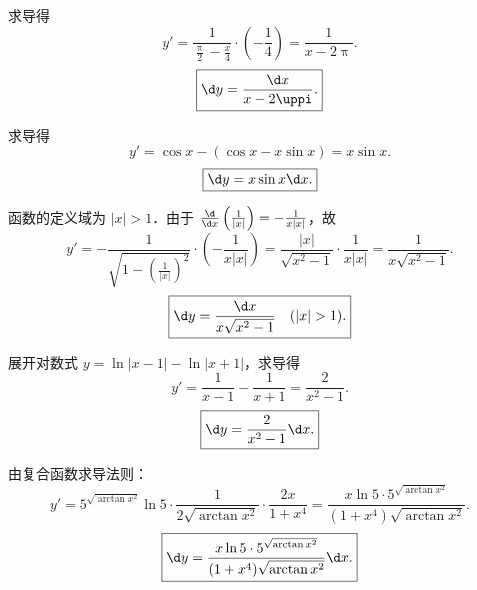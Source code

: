 \begin{solution}

    求导得
    \begin{equation}
        y' = \frac{1}{\frac{\uppi}{2} - \frac{x}{4}} \cdot \left( -\frac{1}{4} \right) = \frac{1}{x - 2\uppi}.
    \end{equation}
    \begin{equation}
        \boxed{\d y = \frac{\d x}{x - 2\uppi}.}
    \end{equation}


    求导得
    \begin{equation}
        y' = \cos x - (\cos x - x\sin x) = x\sin x.
    \end{equation}
    \begin{equation}
        \boxed{\d y = x\sin x \d x.}
    \end{equation}


    函数的定义域为 $|x| > 1$．由于 $\frac{\d}{\d x}\left( \frac{1}{|x|} \right) = -\frac{1}{x|x|}$，故
    \begin{equation}
        y' = -\frac{1}{\sqrt{1 - \left(\frac{1}{|x|}\right)^2}} \cdot \left( -\frac{1}{x|x|} \right) = \frac{|x|}{\sqrt{x^2 - 1}} \cdot \frac{1}{x|x|} = \frac{1}{x\sqrt{x^2 - 1}}.
    \end{equation}
    \begin{equation}
        \boxed{\d y = \frac{\d x}{x\sqrt{x^2 - 1}} \quad (|x| > 1).}
    \end{equation}


    展开对数式 $y = \ln|x-1| - \ln|x+1|$，求导得
    \begin{equation}
        y' = \frac{1}{x-1} - \frac{1}{x+1} = \frac{2}{x^2 - 1}.
    \end{equation}
    \begin{equation}
        \boxed{\d y = \frac{2}{x^2 - 1}\d x.}
    \end{equation}


    由复合函数求导法则：
    \begin{equation}
        y' = 5^{\sqrt{\arctan x^2}} \ln 5 \cdot \frac{1}{2\sqrt{\arctan x^2}} \cdot \frac{2x}{1 + x^4} = \frac{x \ln 5 \cdot 5^{\sqrt{\arctan x^2}}}{(1 + x^4)\sqrt{\arctan x^2}}.
    \end{equation}
    \begin{equation}
        \boxed{\d y = \frac{x \ln 5 \cdot 5^{\sqrt{\arctan x^2}}}{(1 + x^4)\sqrt{\arctan x^2}} \d x.}
    \end{equation}


\end{solution}
